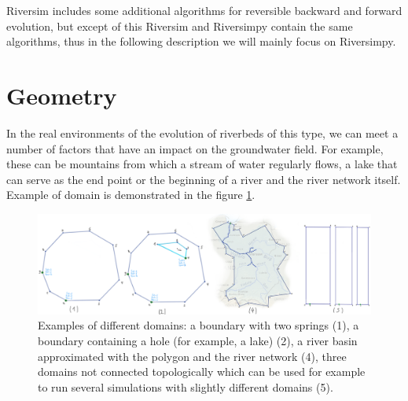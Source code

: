 \documentclass[]{pracamgr}
\begin{document}
    Riversim includes some additional algorithms for reversible backward and forward evolution, but except of this Riversim and Riversimpy contain the same algorithms, thus in the following description we will mainly focus on Riversimpy.

    \section{Geometry}
      
      In the real environments of the evolution of riverbeds of this type, we can meet a number of factors that have an impact on the groundwater field. For example, these can be mountains from which a stream of water regularly flows, a lake that can serve as the end point or the beginning of a river and the river network itself. Example of domain is demonstrated in the figure \ref{geometry_examples}.
      
      \begin{figure}[H]
        \centering
        \includegraphics[width=1\textwidth]{figs/geometry_examples.png}
        \caption{Examples of different domains: a boundary with two springs (1), a boundary containing a hole (for example, a lake) (2), a river basin approximated with the polygon and the river network (4), three domains not connected topologically which can be used for example to run several simulations with slightly different domains (5).}
        \label{geometry_examples}
      \end{figure}
      
\end{document}
